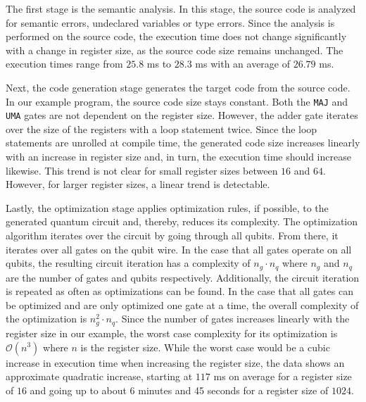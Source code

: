 The first stage is the semantic analysis. In this stage, the source code is analyzed for semantic errors, \eg undeclared variables or type errors. Since the analysis is performed on the source code, the execution time does not change significantly with a change in register size, as the source code size remains unchanged. The execution times range from $25.8$ ms to $28.3$ ms with an average of $26.79$ ms. 

Next, the code generation stage generates the target code from the source code. In our example program, the source code size stays constant. Both the \texttt{MAJ} and \texttt{UMA} gates are not dependent on the register size. However, the adder gate iterates over the size of the registers with a loop statement twice. Since the loop statements are unrolled at compile time, the generated code size increases linearly with an increase in register size and, in turn, the execution time should increase likewise. This trend is not clear for small register sizes between $16$ and $64$. However, for larger register sizes, a linear trend is detectable.

Lastly, the optimization stage applies optimization rules, if possible, to the generated quantum circuit and, thereby, reduces its complexity. The optimization algorithm iterates over the circuit by going through all qubits. From there, it iterates over all gates on the qubit wire. In the case that all gates operate on all qubits, the resulting circuit iteration has a complexity of $n_g \cdot n_q$ where $n_g$ and $n_q$ are the number of gates and qubits respectively. Additionally, the circuit iteration is repeated as often as optimizations can be found. In the case that all gates can be optimized and are only optimized one gate at a time, the overall complexity of the optimization is $n_g^2 \cdot n_q$. Since the number of gates increases linearly with the register size in our example, the worst case complexity for its optimization is $\mathcal{O}(n^3)$ where $n$ is the register size. While the worst case would be a cubic increase in execution time when increasing the register size, the data shows an approximate quadratic increase, starting at $117$ ms on average for a register size of $16$ and going up to about $6$ minutes and 45 seconds for a register size of $1024$. 

